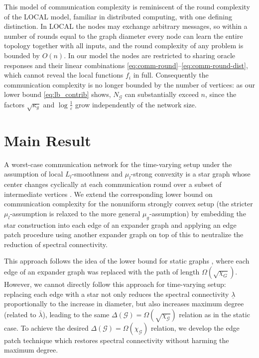 \documentclass[a4paper,USenglish,cleveref, autoref, thm-restate]{lipics-v2021}
\newcommand{\eps}{\varepsilon}
\newcommand{\cG}{{\mathcal G}}
\begin{document}
This model of communication complexity is reminiscent of the round complexity of the LOCAL model, familiar in distributed computing, with one defining distinction. In LOCAL the nodes may exchange arbitrary messages, so within a number of rounds equal to the graph diameter every node can learn the entire topology together with all inputs, and the round complexity of any problem is bounded by $O(n)$. In our model the nodes are restricted to sharing oracle responses and their linear combinations \eqref{eq:comm-round}--\eqref{eq:comm-round-dist}, which cannot reveal the local functions $f_i$ in full. Consequently the communication complexity is no longer bounded by the number of vertices: as our lower bound \eqref{eq:lb_contrib} shows, $N_\cG$ can substantially exceed $n$, since the factors $\sqrt{\kappa_g}$ and $\log\frac1\eps$ grow independently of the network size.

\section{Main Result}

A worst-case communication network for the time-varying setup under the assumption of local $L_l$-smoothness and $\mu_l$-strong convexity is a star graph whose center changes cyclically at each communication round over a subset of intermediate vertices \cite{kovalev2021lower}.
We extend the corresponding lower bound on communication complexity for the nonuniform strongly convex setup (the stricter $\mu_l$-assumption is relaxed to the more general $\mu_g$-assumption) by embedding the star construction into each edge of an expander graph and applying an edge patch procedure using another expander graph on top of this to neutralize the reduction of spectral connectivity.

This approach follows the idea of the lower bound for static graphs \cite{KovKupRog26}, where each edge of an expander graph was replaced with the path of length $\Omega(\sqrt{\chi_G})$.
However, we cannot directly follow this approach for time-varying setup: replacing each edge with a star not only reduces the spectral connectivity $\underline \lambda$ proportionally to the increase in diameter, but also increases maximum degree (related to $\bar \lambda$), leading to the same $\Delta(\cG)= \Omega(\sqrt{\chi_\cG})$ relation as in the static case. 
To achieve the desired $\Delta(\cG)= \Omega(\chi_\cG)$ relation, we develop the edge patch technique which restores spectral connectivity without harming the maximum degree. 
\end{document}

